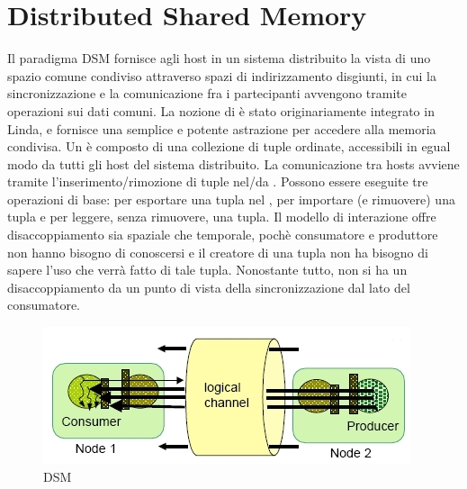 \section{Distributed Shared Memory}
Il paradigma DSM fornisce agli host in un sistema distribuito la vista di uno spazio comune condiviso attraverso spazi di indirizzamento disgiunti, in cui la sincronizzazione e la comunicazione fra i partecipanti avvengono tramite operazioni sui dati comuni. La nozione di  è stato originariamente integrato in Linda, e fornisce una semplice e potente astrazione per accedere alla memoria condivisa. Un  è composto di una collezione di tuple ordinate, accessibili in egual modo da tutti gli host del sistema distribuito. La comunicazione tra hosts avviene tramite l'inserimento/rimozione di tuple nel/da . Possono essere eseguite tre operazioni di base:  per esportare una tupla nel ,  per importare (e rimuovere) una tupla e  per leggere, senza rimuovere, una tupla. Il modello di interazione offre disaccoppiamento sia spaziale che temporale, pochè consumatore e produttore non hanno bisogno di conoscersi e il creatore di una tupla non ha bisogno di sapere l'uso che verrà fatto di tale tupla. Nonostante tutto, non si ha un disaccoppiamento da un punto di vista della sincronizzazione dal lato del consumatore.
\begin{figure}[H]
\begin{center}
\includegraphics[scale=0.7]{etc/dsm1.jpg}
\caption{DSM}
\label{dsm}
\end{center}
\end{figure} 

